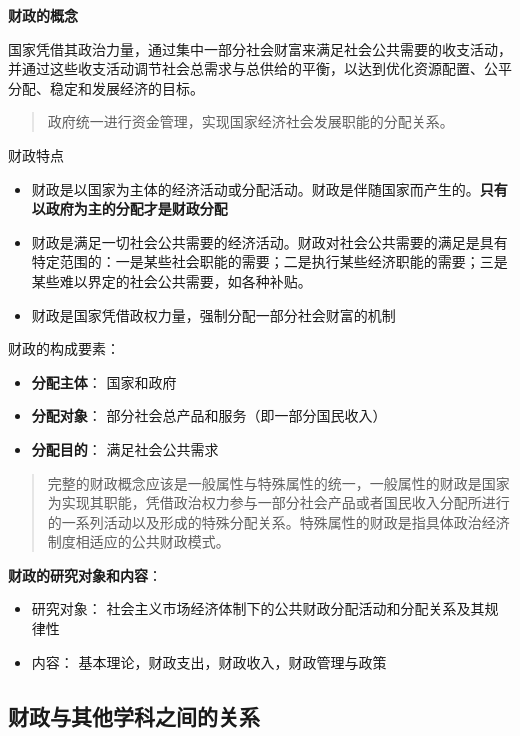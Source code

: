 \documentclass[
]{book}
\providecommand{\tightlist}{%
  \setlength{\itemsep}{0pt}\setlength{\parskip}{0pt}}
\begin{document}
\textbf{财政的概念}

国家凭借其政治力量，通过集中一部分社会财富来满足社会公共需要的收支活动，并通过这些收支活动调节社会总需求与总供给的平衡，以达到优化资源配置、公平分配、稳定和发展经济的目标。

\begin{quote}
政府统一进行资金管理，实现国家经济社会发展职能的分配关系。
\end{quote}

财政特点

\begin{itemize}
\tightlist
\item
  财政是以国家为主体的经济活动或分配活动。财政是伴随国家而产生的。\textbf{只有以政府为主的分配才是财政分配}
\item
  财政是满足一切社会公共需要的经济活动。财政对社会公共需要的满足是具有特定范围的：一是某些社会职能的需要；二是执行某些经济职能的需要；三是某些难以界定的社会公共需要，如各种补贴。
\item
  财政是国家凭借政权力量，强制分配一部分社会财富的机制
\end{itemize}

财政的构成要素：

\begin{itemize}
\tightlist
\item
  \textbf{分配主体}： 国家和政府
\item
  \textbf{分配对象}： 部分社会总产品和服务（即一部分国民收入）
\item
  \textbf{分配目的}： 满足社会公共需求
\end{itemize}

\begin{quote}
完整的财政概念应该是一般属性与特殊属性的统一，一般属性的财政是国家为实现其职能，凭借政治权力参与一部分社会产品或者国民收入分配所进行的一系列活动以及形成的特殊分配关系。特殊属性的财政是指具体政治经济制度相适应的公共财政模式。
\end{quote}

\textbf{财政的研究对象和内容}：

\begin{itemize}
\tightlist
\item
  研究对象： 社会主义市场经济体制下的公共财政分配活动和分配关系及其规律性
\item
  内容： 基本理论，财政支出，财政收入，财政管理与政策
\end{itemize}

\hypertarget{ux8d22ux653fux4e0eux5176ux4ed6ux5b66ux79d1ux4e4bux95f4ux7684ux5173ux7cfb}{%
\subsection{财政与其他学科之间的关系}\label{ux8d22ux653fux4e0eux5176ux4ed6ux5b66ux79d1ux4e4bux95f4ux7684ux5173ux7cfb}}
\end{document}
